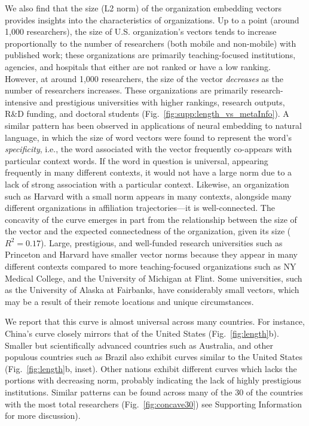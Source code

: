 \documentclass[12pt]{article} %
\def\SI{Supporting Information}
\begin{document}
We also find that the size (L2 norm) of the organization embedding vectors provides insights into the characteristics of organizations.
Up to a point (around 1,000 researchers), the size of U.S. organization's vectors tends to increase proportionally to the number of researchers (both mobile and non-mobile) with published work;
these organizations are primarily teaching-focused institutions, agencies, and hospitals that either are not ranked or have a low ranking.
However, at around 1,000 researchers, the size of the vector \emph{decreases} as the number of researchers increases.
These organizations are primarily research-intensive and prestigious universities with higher rankings, research outputs, R\&D funding, and doctoral students (Fig.~\ref{fig:supp:length_vs_metaInfo}).
A similar pattern has been observed in applications of neural embedding to natural language, in which the size of word vectors were found to represent the word's \emph{specificity}, i.e., the word associated with the vector frequently co-appears with particular context words\autocite{schakel2015measuring}. 
If the word in question is universal, appearing frequently in many different contexts, it would not have a large norm due to a lack of strong association with a particular context.
Likewise, an organization such as Harvard with a small norm appears in many contexts, alongside many different organizations in affiliation trajectories---it is well-connected.
The concavity of the curve emerges in part from the relationship between the size of the vector and the expected connectedness of the organization, given its size ($R^{2} = 0.17$).
Large, prestigious, and well-funded research universities such as Princeton and Harvard have smaller vector norms because they appear in many different contexts compared to more teaching-focused organizations such as NY Medical College, and the University of Michigan at Flint.
Some universities, such as the University of Alaska at Fairbanks, have considerably small vectors, which may be a result of their remote locations and unique circumstances.


We report that this curve is almost universal across many countries. 
For instance, China's curve closely mirrors that of the United States (Fig.~\ref{fig:length}b).
Smaller but scientifically advanced countries such as Australia, and other populous countries such as Brazil also exhibit curves similar to the United States (Fig.~\ref{fig:length}b, inset).
Other nations exhibit different curves which lacks the portions with decreasing norm, probably indicating the lack of highly prestigious institutions.
Similar patterns can be found across many of the 30 of the countries with the most total researchers (Fig.~\ref{fig:concave30}) see \SI{} for more discussion).
\end{document}
